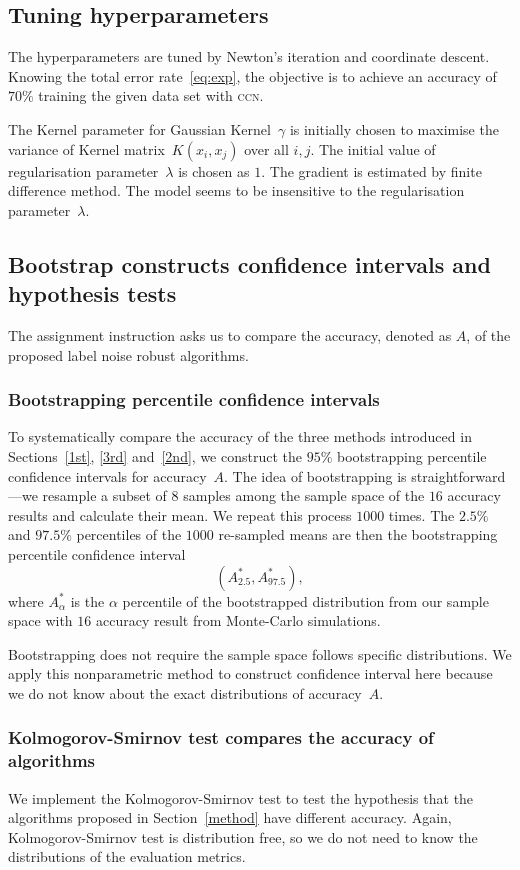 \documentclass[12pt]{article} %
\begin{document}
\subsection{Tuning hyperparameters}
The hyperparameters are tuned by Newton's iteration and coordinate descent. Knowing the total error rate~\eqref{eq:exp}, the objective is to achieve an accuracy of $70\%$ training the given data set with \textsc{ccn}. 

The Kernel parameter for Gaussian Kernel~$\gamma$ is initially chosen to maximise the variance of Kernel matrix~$K(x_i,x_j)$ over all $i,j$. 
The initial value of regularisation parameter~$\lambda$ is chosen as $1$. 
The gradient is estimated by finite difference method. 
The model seems to be insensitive to the regularisation parameter~$\lambda$.

\subsection{Bootstrap constructs confidence intervals and hypothesis tests}
The assignment instruction asks us to compare the accuracy, denoted as $A$, of the proposed label noise robust algorithms. 
\subsubsection{Bootstrapping percentile confidence intervals}\label{ci}
To systematically compare the accuracy of the three methods introduced in Sections~\ref{1st}, \ref{3rd} and~\ref{2nd}, we construct the $95\%$ bootstrapping percentile confidence intervals for accuracy~$A$. The idea of bootstrapping  is straightforward---we resample a subset of $8$ samples among the sample space of the $16$ accuracy results and calculate their mean. We repeat this process $1000$ times. The $2.5\%$ and $97.5\%$ percentiles of the $1000$ re-sampled means are then the bootstrapping percentile confidence interval
\begin{equation}
({A}^*_{2.5}, {A}^*_{97.5}), \label{eq:boot}
\end{equation}
where $A^*_{\alpha}$ is the $\alpha$ percentile of the bootstrapped distribution from our sample space with $16$ accuracy result from Monte-Carlo simulations.

Bootstrapping does not require the sample space follows specific distributions. We apply this nonparametric method to construct confidence interval here because we do not know about the exact distributions of accuracy~$A$.

\subsubsection{Kolmogorov-Smirnov test compares the accuracy of algorithms}\label{sec:ks}
We implement the Kolmogorov-Smirnov test to test the hypothesis that the algorithms proposed in Section~\ref{method} have different accuracy.  Again, Kolmogorov-Smirnov test is distribution free, so we do not need to know the distributions of the evaluation metrics.
\end{document}
